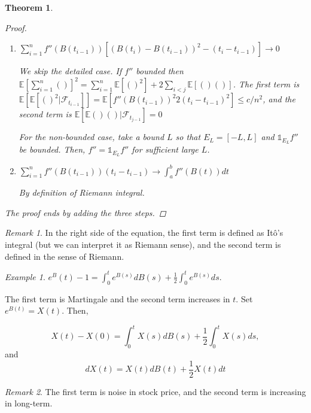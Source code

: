 \documentclass[12pt]{report}
\newcommand{\F}{\mathcal{F}}
\newcommand{\E}{\mathbb{E}}
\renewcommand{\1}{\mathbb{1}}
\theoremstyle{break}
\newtheorem{thm}{Theorem}[section] %
\theoremstyle{newdef}
\theoremstyle{remark}
\newtheorem*{exmp}{Example} %
\newtheorem*{rem}{Remark} %
\begin{document}
\begin{thm}
\begin{proof}
\begin{enumerate}[label={\bfseries STEP \arabic*}, wide]
($\because$
let $M = \max\{B(t): t\in[a,b]\}$ and $m = \min\{B(t): t\in[a,b]\}$.
Then
$$
Z(\delta) = \sup_{x,y\in[m,M], |x-y|<\delta} |f''(y)-f''(x)| \rightarrow 0
$$
as $\delta \searrow 0$ by uniform continuity.
Moreover $D_n := \sup_{i=1\sim n} |B(t_i) - B(t_{i-1})| \rightarrow 0$ as $n\rightarrow\infty$ since Brownian motion is a.s. continous.
Then, $Y_n \leq Z(D_n) \rightarrow 0$ a.s. as $n\rightarrow 0$.)

\item
$\sum_{i=1}^n f''(B(t_{i-1}))\left[ (B(t_i) - B(t_{i-1}))^2 - (t_i-t_{i-1}) \right] \rightarrow 0$

We skip the detailed case.
If $f''$ bounded then
$\E[\sum_{i=1}^n()]^2 = \sum_{i=1}^n \E[()^2] + 2\sum_{i<j}\E[()()]$.
The first term is $\E[\E[()^2|\F_{t_{i-1}}]] = \E[f''(B(t_{i-1}))^2 2(t_i-t_{i-1})^2] \leq c/n^2$,
and the second term is $\E[\E()()|\F_{t_{j-1}}] = 0$

For the non-bounded case, take a bound $L$ so that $E_L = [-L, L]$ and $\1_{E_L}f''$ be bounded.
Then, $f'' = \1_{E_L}f''$ for sufficient large $L$.

\item
$\sum_{i=1}^n f''(B(t_{i-1}))(t_i-t_{i-1}) \rightarrow \int_a^b f''(B(t))dt$

By definition of Riemann integral.
\end{enumerate}
The proof ends by adding the three steps.
\end{proof}
\end{thm}

\begin{rem}
In the right side of the equation, the first term is defined as It\^o's integral (but we can interpret it as Riemann sense), and the second term is defined in the sense of Riemann.
\end{rem}


\begin{exmp}
$e^B(t) - 1= \int_0^t e^{B(s)}dB(s) + \frac{1}{2}\int_0^t e^{B(s)}ds.$

The first term is Martingale and the second term increases in $t$.
Set $e^{B(t)} = X(t)$.
Then,

$$
X(t) - X(0) = \int_0^t X(s) dB(s) + \frac{1}{2} \int_0^t X(s)ds,
$$
and
\begin{equation}
dX(t) = X(t)dB(t) + \frac{1}{2}X(t)dt\tag{SDE}
\end{equation}
\end{exmp}

\begin{rem}
The first term is noise in stock price, and the second term is increasing in long-term.
\end{rem}
\end{document}
